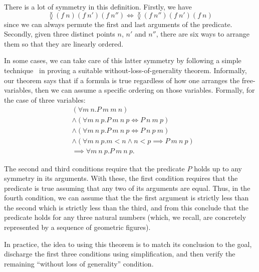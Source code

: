 There is a lot of symmetry in this definition. Firstly, we have
\begin{displaymath}
\between{(f\ n)}{(f\ n')}{(f\ n'')} \iff \between{(f\ n'')}{(f\ n')}{(f\ n)}
\end{displaymath}
since we can always permute the first and last arguments of the  predicate. Secondly, given three distinct points $n$, $n'$ and $n''$, there are six ways to arrange them so that they are linearly ordered.

In some cases, we can take care of this latter symmetry by following a simple technique~\cite{HarrisonWLOG} in proving a suitable  without-loss-of-generality theorem. Informally, our theorem says that if a formula is true regardless of how one arranges the free-variables, then we can assume a specific ordering on those variables. Formally, for the case of three variables:
\begin{displaymath}
  \begin{split}
    &(\forall m\ n. P\ m\ m\ n)\\
    &\wedge \left(\forall m\ n\ p. P\ m\ n\ p \iff P\ n\ m\ p\right)\\
    &\wedge \left(\forall m\ n\ p. P\ m\ n\ p \iff P\ n\ p\ m\right)\\
    &\wedge (\forall m\ n\ p. m < n \wedge n < p \implies P\ m\ n\ p)\\
    &\implies \forall m\ n\ p. P\ m\ n\ p.
  \end{split}
\end{displaymath}

The second and third conditions require that the predicate $P$ holds up to any symmetry in its arguments. With these, the first condition requires that the predicate is true assuming that any two of its arguments are equal. Thus, in the fourth condition, we can assume that the the first argument is strictly less than the second which is strictly less than the third, and from this conclude that the predicate holds for any three natural numbers (which, we recall, are concretely represented by a sequence of geometric figures). 

In practice, the idea to using this theorem is to match its conclusion to the goal, discharge the first three conditions using simplification, and then verify the remaining ``without loss of generality'' condition.



